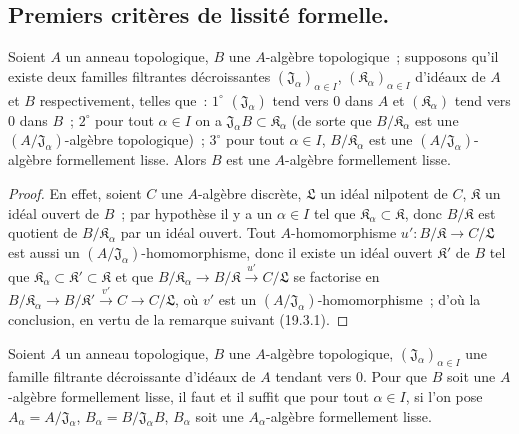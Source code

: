 \subsection{Premiers critères de lissité formelle.}
\label{subsection:0.19.4-fr}

\begin{proposition}[19.4.1]
\label{0.19.4.1-fr}
Soient $A$ un anneau topologique, $B$ une $A$-algèbre topologique~; supposons
qu'il existe deux familles filtrantes décroissantes
$(\mathfrak J_\alpha)_{\alpha\in I}$,
$(\mathfrak K_\alpha)_{\alpha\in I}$ d'idéaux de $A$ et $B$
respectivement, telles que~:
$1^\circ$ $(\mathfrak J_\alpha)$ tend vers $0$ dans $A$ et
$(\mathfrak K_\alpha)$ tend vers $0$ dans $B$~;
$2^\circ$ pour tout $\alpha\in I$ on a
$\mathfrak J_\alpha B\subset\mathfrak K_\alpha$ (de sorte que
$B/\mathfrak K_\alpha$ est une
$(A/\mathfrak J_\alpha)$-algèbre topologique)~;
$3^\circ$ pour tout $\alpha\in I$,
$B/\mathfrak K_\alpha$ est une
$(A/\mathfrak J_\alpha)$-algèbre formellement lisse.
Alors $B$ est une $A$-algèbre formellement lisse.
\end{proposition}

\begin{proof}
En effet, soient $C$ une $A$-algèbre discrète, $\mathfrak L$ un idéal
nilpotent de $C$, $\mathfrak K$ un idéal ouvert de $B$~; par hypothèse il y a
un $\alpha\in I$ tel que
$\mathfrak K_\alpha\subset\mathfrak K$, donc $B/\mathfrak K$ est
quotient de $B/\mathfrak K_\alpha$ par un idéal ouvert. Tout
$A$-homomorphisme $u':B/\mathfrak K\to C/\mathfrak L$ est aussi un
$(A/\mathfrak J_\alpha)$-homomorphisme, donc il existe un idéal ouvert
$\mathfrak K'$ de $B$ tel que
$\mathfrak K_\alpha\subset\mathfrak K'\subset\mathfrak K$ et que
$B/\mathfrak K_\alpha\to B/\mathfrak K\xrightarrow{u'}C/\mathfrak L$
se factorise en
$B/\mathfrak K_\alpha\to B/\mathfrak K'\xrightarrow{v'}C\to C/\mathfrak L$,
où $v'$ est un
$(A/\mathfrak J_\alpha)$-homomorphisme~; d'où la conclusion, en vertu de
la remarque suivant (19.3.1).
\end{proof}

\begin{corollary}[19.4.2]
\label{0.19.4.2-fr}
Soient $A$ un anneau topologique, $B$ une $A$-algèbre topologique,
$(\mathfrak J_\alpha)_{\alpha\in I}$ une famille filtrante décroissante
d'idéaux de $A$ tendant vers $0$. Pour que $B$ soit une $A$-algèbre
formellement lisse, il faut et il suffit que pour tout $\alpha\in I$, si
l'on pose $A_\alpha=A/\mathfrak J_\alpha$,
$B_\alpha=B/\mathfrak J_\alpha B$, $B_\alpha$ soit une
$A_\alpha$-algèbre formellement lisse.
\end{corollary}

